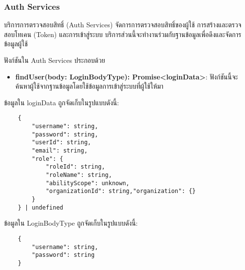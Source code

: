 \subsubsection{Auth Services}
\ifenglish
\else
บริการการตรวจสอบสิทธิ์ (Auth Services) จัดการการตรวจสอบสิทธิ์ของผู้ใช้ การสร้างและตรวจสอบโทเคน (Token) และการเข้าสู่ระบบ บริการส่วนนี้จะทำงานร่วมกับฐานข้อมูลเพื่อดึงและจัดการข้อมูลผู้ใช้

ฟังก์ชันใน Auth Services ประกอบด้วย

\begin{itemize}
    \item \textbf{findUser(body: LoginBodyType): Promise<loginData>}: ฟังก์ชันนี้จะค้นหาผู้ใช้จากฐานข้อมูลโดยใช้ข้อมูลการเข้าสู่ระบบที่ผู้ใช้ให้มา
\end{itemize}

ข้อมูลใน loginData ถูกจัดเก็บในรูปแบบดังนี้:
\begin{lstlisting}
    {
        "username": string, 
        "password": string, 
        "userId": string, 
        "email": string, 
        "role": {
            "roleId": string, 
            "roleName": string, 
            "abilityScope": unknown,
            "organizationId": string,"organization": {}
        }
    } | undefined
\end{lstlisting}

\clearpage

ข้อมูลใน LoginBodyType ถูกจัดเก็บในรูปแบบดังนี้:
\begin{lstlisting}
    {
        "username": string, 
        "password": string
    }
\end{lstlisting}
\fi